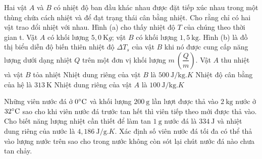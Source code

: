 \begin{ex}
Hai vật $A$ và $B$ có nhiệt độ ban đầu khác nhau được đặt tiếp xúc nhau trong một thùng chứa cách nhiệt và để đạt trạng thái cân bằng nhiệt. Cho rằng chỉ có hai vật trao đổi nhiệt với nhau. Hình (a) cho thấy nhiệt độ $T$ của chúng theo thời gian t. Vật $A$ có khối lượng $5,0 {~\mathrm{K} g}$; vật $B$ có khối lượng $1,5\ \mathrm{kg}$. Hình (b) là đồ thị biểu diễn độ biến thiên nhiệt độ $\Delta T_s$ của vật $B$ khi nó được cung cấp năng lượng dưới dạng nhiệt $Q$ trên một đơn vị khối lượng $m\ (\dfrac{Q}{m})$.
\choiceTF
{Vật $A$ thu nhiệt và vật $B$ tỏa nhiệt}
{Nhiệt dung riêng của vật $B$ là $500\ \mathrm{J/kg}.K$}
{\True Nhiệt độ cân bằng của hệ là $313\ \mathrm{K}$}
{\True Nhiệt dung riêng của vật $A$ là $100\ \mathrm{J/kg}.K$}
\end{ex}

\begin{ex}
Những viên nước đá ở $\rm 0^\circ \mathrm{C}$ và khối lượng $200\ \mathrm{g}$ lần lượt được thả vào $2\ \mathrm{kg}$ nước ở $\rm 32^\circ \mathrm{C}$ sao cho khi viên nước đá trước tan hết thì viên tiếp theo mới được thả vào. Cho biết năng lượng nhiệt cần thiết để làm tan $1\ \mathrm{g}$ nước đá là $334\ \mathrm{J}$ và nhiệt dung riêng của nước là $4,186\ \mathrm{J/g}.K$. Xác định số viên nước đá tối đa có thể thả vào lượng nước trên sao cho trong nước không còn sót lại chút nước đá nào chưa tan chảy.
\end{ex}

